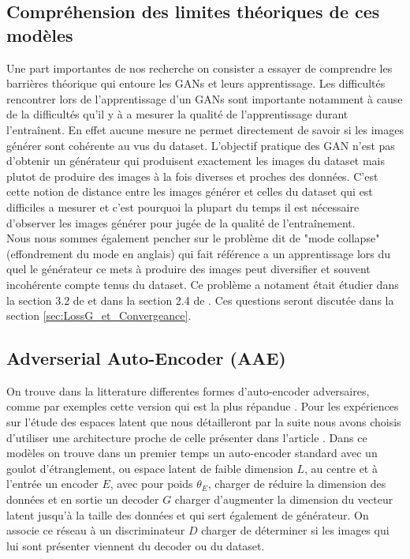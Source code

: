 \documentclass[11pt,francais]{article}
\begin{document}
\subsection{Compréhension des limites théoriques de ces modèles}
\label{sec:CompEtLimites}
Une part importantes de nos recherche on consister a essayer de comprendre les barrières théorique qui entoure les GANs et leurs apprentissage.
Les difficultés rencontrer lors de l'apprentissage d'un GANs sont importante notamment à cause de la difficultés qu'il y à a mesurer la qualité de l'apprentissage durant l'entraînent. En effet aucune mesure ne permet directement de savoir si les images générer sont cohérente au vus du dataset. L'objectif pratique des GAN n'est pas d'obtenir un générateur qui produisent exactement les images du dataset mais plutot de produire des images à la fois diverses et proches des données. C'est cette notion de distance entre les images générer et celles du dataset qui est difficiles a mesurer et c'est pourquoi la plupart du temps il est nécessaire d'observer les images générer pour jugée de la qualité de l'entraînement.\\
Nous nous sommes également pencher sur le problème dit de "mode collapse" (effondrement du mode en anglais) qui fait référence a un apprentissage lors du quel le générateur ce mets à produire des images peut diversifier et souvent incohérente compte tenus du dataset. Ce problème a notament était étudier dans la section 3.2 de \cite{salimans2016improved} et dans la section 2.4 de \cite{DBLP:journals/corr/MetzPPS16}.
Ces questions seront discutée dans la section \ref{sec:LossG_et_Convergeance}.

\subsection{Adverserial Auto-Encoder (AAE)}
\label{sec:AAE}
On trouve dans la litterature differentes formes d'auto-encoder adversaires, comme par exemples cette version qui est la plus répandue \cite{makhzani2015adversarial}.
Pour les expériences sur l'étude des espaces latent que nous détailleront par la suite nous avons choisis d'utiliser une architecture proche de celle présenter dans l'article \cite{GADAE}.
Dans ce modèles on trouve dans un premier temps un auto-encoder standard avec un goulot d'étranglement, ou espace latent de faible dimension \(L\), au centre et à l'entrée un encoder \(E\), avec pour poids \(\theta_E\), charger de réduire la dimension des données et en sortie un decoder \(G\) charger d'augmenter la dimension du vecteur latent jusqu'à la taille des données et qui sert également de générateur. On associe ce réseau à un discriminateur \(D\) charger de déterminer si les images qui lui sont présenter viennent du decoder ou du dataset.
\end{document}
